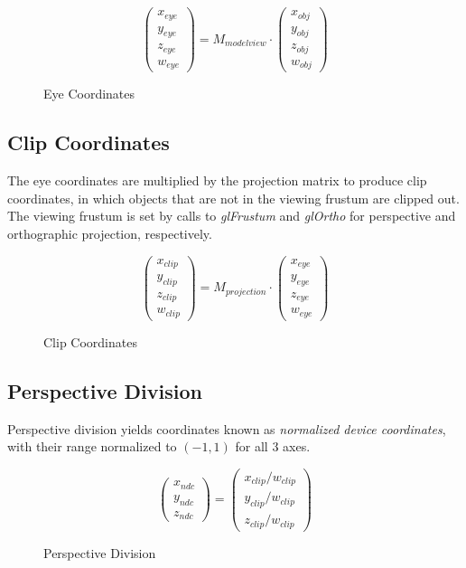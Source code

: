 \documentclass[letterpaper,10pt]{article}
\begin{document}
\begin{figure}[h]
\[
\begin{pmatrix}
x_{eye} \\
y_{eye} \\
z_{eye} \\
w_{eye}
\end{pmatrix}
= M_{modelview} \cdot
\begin{pmatrix}
x_{obj} \\
y_{obj} \\
z_{obj} \\
w_{obj}
\end{pmatrix}
\]
\caption{Eye Coordinates}
\end{figure}

\subsection{Clip Coordinates}
The eye coordinates are multiplied by the projection matrix to produce clip coordinates, in which objects that are not in the viewing frustum are clipped out. The viewing frustum is set by calls to \emph{glFrustum} and \emph{glOrtho} for perspective and orthographic projection, respectively. \\
\begin{figure}[h]
\[
\begin{pmatrix}
x_{clip} \\
y_{clip} \\
z_{clip} \\
w_{clip}
\end{pmatrix}
= M_{projection} \cdot
\begin{pmatrix}
x_{eye} \\
y_{eye} \\
z_{eye} \\
w_{eye}
\end{pmatrix}
\]
\caption{Clip Coordinates}
\end{figure}

\subsection{Perspective Division}
Perspective division yields coordinates known as \emph{normalized device coordinates}, with their range normalized to $(-1,1)$ for all 3 axes.\\
\begin{figure}[h]
\[
\begin{pmatrix}
x_{ndc} \\
y_{ndc} \\
z_{ndc}
\end{pmatrix}
=
\begin{pmatrix}
x_{clip}/w_{clip} \\
y_{clip}/w_{clip} \\
z_{clip}/w_{clip}
\end{pmatrix}
\]
\caption{Perspective Division}
\end{figure}
\end{document}
